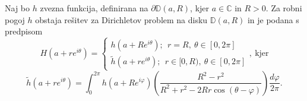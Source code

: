 \documentclass[mat1, tisk]{fmfdelo}
\begin{document}
    \begin{trditev}
        \label{alldisk}
        Naj bo $h$ zvezna funkcija, definirana na $\partial \mathbb{D}(a,R)$, kjer $a \in \mathbb{C}$ in $R>0$.  
        Za robni pogoj $h$ obstaja rešitev za Dirichletov problem na disku $\mathbb{D}(a,R)$ in je podana s predpisom
        $$
            H(a + r e^{i \theta}) = \begin{cases}
                    h(a + R e^{i \theta});~~r = R,~\theta \in [0, 2\pi]\\
                    \widetilde{h}(a + r e^{i \theta});~~ r \in [0,R),~ \theta \in [0, 2\pi]
            \end{cases},~\text{kjer}
        $$
        $$
        \widetilde{h}(a + r e^{i \theta}) = \int_{0}^{2 \pi}{h(a + R e^{i \varphi}) \left(\frac{R^2 - r^2}{R^2 + r^2 - 2Rr \cos(\theta - \varphi)}\right) \frac{d \varphi}{2 \pi}}.
        $$
     \end{trditev}
\end{document}
